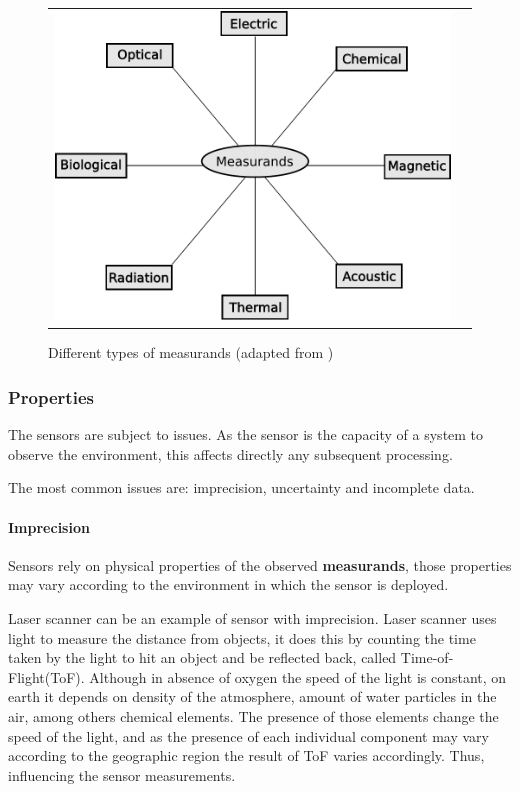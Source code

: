 \begin{figure}[h]
   \centering
     \begin{tabular}{lr}
       \includegraphics[scale=0.70]{img/fig:sensors}
     \end{tabular}
   \caption{Different types of measurands (adapted from \cite{WhiteRichard})}
   \label{fig:sensors}
 \end{figure}

\subsubsection{Properties}

The sensors are subject to issues. As the sensor is the capacity of a system to observe the environment, this affects directly any subsequent processing.

The most common issues are: imprecision, uncertainty and incomplete data. 

\paragraph{Imprecision} Sensors rely on physical properties of the observed \textbf{measurands}, those properties may vary according to the environment in which the sensor is deployed.

Laser scanner can be an example of sensor with imprecision. Laser scanner uses light to measure the distance from objects, it does this by counting the time taken by the light to hit an object and be reflected back, called Time-of-Flight(ToF). Although in absence of oxygen the speed of the light is constant, on earth it depends on density of the atmosphere, amount of water particles in the air, among others chemical elements. The presence of those elements change the speed of the light, and as the presence of each individual component may vary according to the geographic region the result of ToF varies accordingly. Thus, influencing the sensor measurements.

